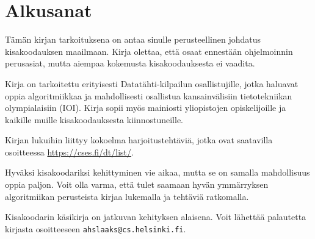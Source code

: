 \chapter*{Alkusanat}

Tämän kirjan tarkoituksena on antaa sinulle
perusteellinen johdatus kisakoodauksen maailmaan.
Kirja olettaa, että osaat ennestään
ohjelmoinnin perusasiat, mutta aiempaa kokemusta
kisakoodauksesta ei vaadita.

Kirja on tarkoitettu erityisesti
Datatähti-kilpailun osallistujille,
jotka haluavat oppia algoritmiikkaa
ja mahdollisesti osallistua kansainvälisiin
tietotekniikan olympialaisiin (IOI).
Kirja sopii myös mainiosti 
yliopistojen opiskelijoille ja
kaikille muille kisakoodauksesta kiinnostuneille.

Kirjan lukuihin liittyy kokoelma harjoitustehtäviä,
jotka ovat saatavilla osoitteessa \url{https://cses.fi/dt/list/}.

Hyväksi kisakoodariksi kehittyminen vie aikaa,
mutta se on samalla mahdollisuus oppia paljon.
Voit olla varma, että tulet saamaan hyvän ymmärryksen
algoritmiikan perusteista
kirjaa lukemalla ja tehtäviä ratkomalla.

Kisakoodarin käsikirja on jatkuvan kehityksen alaisena.
Voit lähettää palautetta kirjasta
osoitteeseen
\texttt{ahslaaks@cs.helsinki.fi}.
